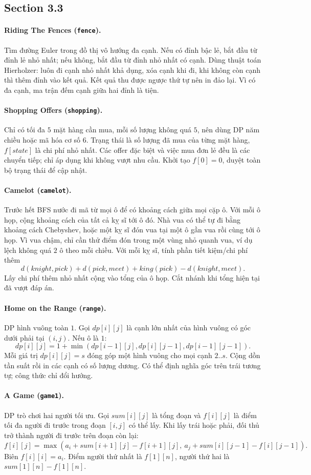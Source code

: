 \documentclass[11pt]{article}
\newcommand{\problem}[2]{\paragraph{#1 (\texttt{#2}).}}
\begin{document}
\subsection*{Section 3.3}

\problem{Riding The Fences}{fence}
Tìm đường Euler trong đồ thị vô hướng đa cạnh. Nếu có đỉnh bậc lẻ, bắt đầu từ đỉnh lẻ nhỏ nhất; nếu không, bắt đầu từ đỉnh nhỏ nhất có cạnh. Dùng thuật toán Hierholzer: luôn đi cạnh nhỏ nhất khả dụng, xóa cạnh khi đi, khi không còn cạnh thì thêm đỉnh vào kết quả. Kết quả thu được ngược thứ tự nên in đảo lại. Vì có đa cạnh, ma trận đếm cạnh giữa hai đỉnh là tiện.

\problem{Shopping Offers}{shopping}
Chỉ có tối đa \(5\) mặt hàng cần mua, mỗi số lượng không quá \(5\), nên dùng DP năm chiều hoặc mã hóa cơ số \(6\). Trạng thái là số lượng đã mua của từng mặt hàng, \(f[state]\) là chi phí nhỏ nhất. Các offer đặc biệt và việc mua đơn lẻ đều là các chuyển tiếp; chỉ áp dụng khi không vượt nhu cầu. Khởi tạo \(f[0]=0\), duyệt toàn bộ trạng thái để cập nhật.

\problem{Camelot}{camelot}
Trước hết BFS nước đi mã từ mọi ô để có khoảng cách giữa mọi cặp ô. Với mỗi ô họp, cộng khoảng cách của tất cả kỵ sĩ tới ô đó. Nhà vua có thể tự đi bằng khoảng cách Chebyshev, hoặc một kỵ sĩ đón vua tại một ô gần vua rồi cùng tới ô họp. Vì vua chậm, chỉ cần thử điểm đón trong một vùng nhỏ quanh vua, ví dụ lệch không quá \(2\) ô theo mỗi chiều. Với mỗi kỵ sĩ, tính phần tiết kiệm/chi phí thêm
\[
d(knight,pick)+d(pick,meet)+king(pick)-d(knight,meet).
\]
Lấy chi phí thêm nhỏ nhất cộng vào tổng của ô họp. Cắt nhánh khi tổng hiện tại đã vượt đáp án.

\problem{Home on the Range}{range}
DP hình vuông toàn \(1\). Gọi \(dp[i][j]\) là cạnh lớn nhất của hình vuông có góc dưới phải tại \((i,j)\). Nếu ô là \(1\):
\[
  dp[i][j]=1+\min(dp[i-1][j],dp[i][j-1],dp[i-1][j-1]).
\]
Mỗi giá trị \(dp[i][j]=s\) đóng góp một hình vuông cho mọi cạnh \(2..s\). Cộng dồn tần suất rồi in các cạnh có số lượng dương. Có thể định nghĩa góc trên trái tương tự; công thức chỉ đổi hướng.

\problem{A Game}{game1}
DP trò chơi hai người tối ưu. Gọi \(sum[i][j]\) là tổng đoạn và \(f[i][j]\) là điểm tối đa người đi trước trong đoạn \([i,j]\) có thể lấy. Khi lấy trái hoặc phải, đối thủ trở thành người đi trước trên đoạn còn lại:
\[
  f[i][j]=\max(a_i+sum[i+1][j]-f[i+1][j],\ a_j+sum[i][j-1]-f[i][j-1]).
\]
Biên \(f[i][i]=a_i\). Điểm người thứ nhất là \(f[1][n]\), người thứ hai là \(sum[1][n]-f[1][n]\).
\end{document}

